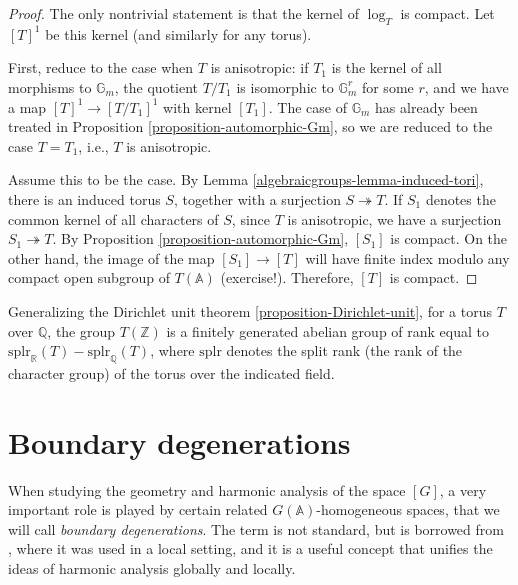 \begin{proof}
 The only nontrivial statement is that the kernel of $\log_T$ is compact.  Let $[T]^1$ be this kernel (and similarly for any torus). 
 
 First, reduce to the case when $T$ is anisotropic: if $T_1$ is the kernel of all morphisms to $\mathbb G_m$, the quotient $T/T_1$ is isomorphic to $\mathbb G_m^r$ for some $r$, and we have a map $[T]^1 \to [T/T_1]^1$ with kernel $[T_1]$. The case of $\mathbb G_m$ has already been treated in Proposition \ref{proposition-automorphic-Gm}, so we are reduced to the case $T=T_1$, i.e., $T$ is anisotropic.
 
 Assume this to be the case. By Lemma \ref{algebraicgroups-lemma-induced-tori}, there is an induced torus $S$, together with a surjection $S\twoheadrightarrow T$. If $S_1$ denotes the common kernel of all characters of $S$, since $T$ is anisotropic, we have a surjection $S_1\twoheadrightarrow T$. By Proposition \ref{proposition-automorphic-Gm}, $[S_1]$ is compact. On the other hand, the image of the map $[S_1]\to [T]$ will have finite index modulo any compact open subgroup of $T(\mathbb A)$ (exercise!). Therefore, $[T]$ is compact.
\end{proof}

\begin{remark}
 \label{remark-Dirichlet-unit-torus}
 Generalizing the Dirichlet unit theorem \ref{proposition-Dirichlet-unit}, for a torus $T$ over $\mathbb Q$, the group $T(\mathbb Z)$ is a finitely generated abelian group of rank equal to $\mbox{splr}_{\mathbb R}(T) - \mbox{splr}_{\mathbb Q}(T)$, where $\mbox{splr}$ denotes the split rank (the rank of the character group) of the torus over the indicated field.
\end{remark}



\section{Boundary degenerations}
\label{section-boundary-degenerations}

When studying the geometry and harmonic analysis of the space $[G]$, a very important role is played by certain related $G(\mathbb A)$-homogeneous spaces, that we will call \emph{boundary degenerations}. The term is not standard, but is borrowed from \cite{Sakellaridis-Venkatesh}, where it was used in a local setting, and it is a useful concept that unifies the ideas of harmonic analysis globally and locally.

